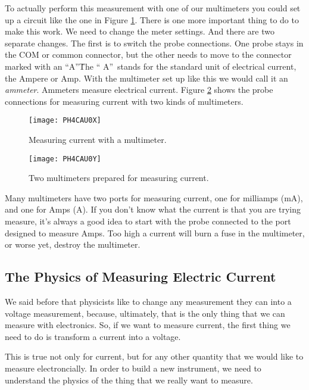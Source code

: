 To actually perform this measurement with one of our
multimeters you could set up a circuit like the one in Figure
\ref{fig:measuring_current_b}. 
There is one more important thing
to do to make this work. We need to change the meter settings. And there are
two separate changes. The first is to switch the probe connections. One
probe stays in the COM or common connector, but the other needs to move to
the connector marked with an \textquotedblleft A\textquotedblright\. 
The \textquotedblleft
A\textquotedblright\ stands for the standard unit of electrical current, the
Ampere or Amp. With the multimeter set up like this we would call it an 
\emph{ammeter}. Ammeters measure electrical current.
Figure \ref{fig:multimeters_amps} shows the probe connections for measuring
current with two kinds of multimeters. 
\begin{figure}[htbp!]
\centering
\texttt{[image: PH4CAU0X]}
\caption[Measuring current with a multimeter]{Measuring current with a
multimeter.}
\label{fig:measuring_current_b}
\end{figure}
\begin{figure}[htbp!]
\centering
\texttt{[image: PH4CAU0Y]}
\caption[Two multimeters prepared for measuring current]{Two multimeters
prepared for measuring current.}
\label{fig:multimeters_amps}
\end{figure}

Many
multimeters have two ports for measuring current, one for milliamps (mA), and
one for Amps (A). If you don't know what the current is that you are trying 
measure, it's always a good idea to start with the probe connected to the port
designed to measure Amps. Too high a current will burn a fuse in the 
multimeter, or worse yet, destroy the multimeter.

\subsection{The Physics of Measuring Electric Current}

We said before that physicists like to change any measurement they can into
a voltage measurement, because, ultimately, that is the only thing that we
can measure with electronics. So, if we want to measure current, the first
thing we need to do is transform a current into a voltage.

This is true not only for current, but for any other quantity that we would
like to measure electroncially. 
In order to build a new instrument, we need to understand the physics of the 
thing that we really want to measure. 

